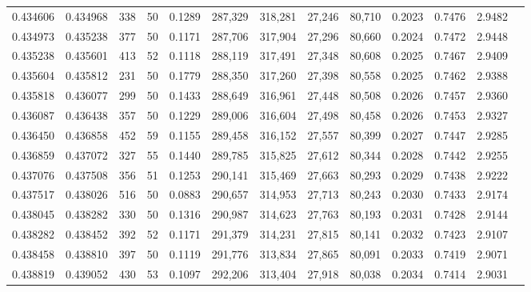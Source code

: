 \begin{tabular}{rrrrrrrrrrrrr}
0.434606 & 0.434968 &   338 &  50 &                                     0.1289 & 287,329 & 318,281 &  27,246 &  80,710 & 0.2023 & 0.7476 & 2.9482 \\
0.434973 & 0.435238 &   377 &  50 &                                     0.1171 & 287,706 & 317,904 &  27,296 &  80,660 & 0.2024 & 0.7472 & 2.9448 \\
0.435238 & 0.435601 &   413 &  52 &                                     0.1118 & 288,119 & 317,491 &  27,348 &  80,608 & 0.2025 & 0.7467 & 2.9409 \\
0.435604 & 0.435812 &   231 &  50 &                                     0.1779 & 288,350 & 317,260 &  27,398 &  80,558 & 0.2025 & 0.7462 & 2.9388 \\
0.435818 & 0.436077 &   299 &  50 &                                     0.1433 & 288,649 & 316,961 &  27,448 &  80,508 & 0.2026 & 0.7457 & 2.9360 \\
0.436087 & 0.436438 &   357 &  50 &                                     0.1229 & 289,006 & 316,604 &  27,498 &  80,458 & 0.2026 & 0.7453 & 2.9327 \\
0.436450 & 0.436858 &   452 &  59 &                                     0.1155 & 289,458 & 316,152 &  27,557 &  80,399 & 0.2027 & 0.7447 & 2.9285 \\
0.436859 & 0.437072 &   327 &  55 &                                     0.1440 & 289,785 & 315,825 &  27,612 &  80,344 & 0.2028 & 0.7442 & 2.9255 \\
0.437076 & 0.437508 &   356 &  51 &                                     0.1253 & 290,141 & 315,469 &  27,663 &  80,293 & 0.2029 & 0.7438 & 2.9222 \\
0.437517 & 0.438026 &   516 &  50 &                                     0.0883 & 290,657 & 314,953 &  27,713 &  80,243 & 0.2030 & 0.7433 & 2.9174 \\
0.438045 & 0.438282 &   330 &  50 &                                     0.1316 & 290,987 & 314,623 &  27,763 &  80,193 & 0.2031 & 0.7428 & 2.9144 \\
0.438282 & 0.438452 &   392 &  52 &                                     0.1171 & 291,379 & 314,231 &  27,815 &  80,141 & 0.2032 & 0.7423 & 2.9107 \\
0.438458 & 0.438810 &   397 &  50 &                                     0.1119 & 291,776 & 313,834 &  27,865 &  80,091 & 0.2033 & 0.7419 & 2.9071 \\
0.438819 & 0.439052 &   430 &  53 &                                     0.1097 & 292,206 & 313,404 &  27,918 &  80,038 & 0.2034 & 0.7414 & 2.9031 \\

\end{tabular}
